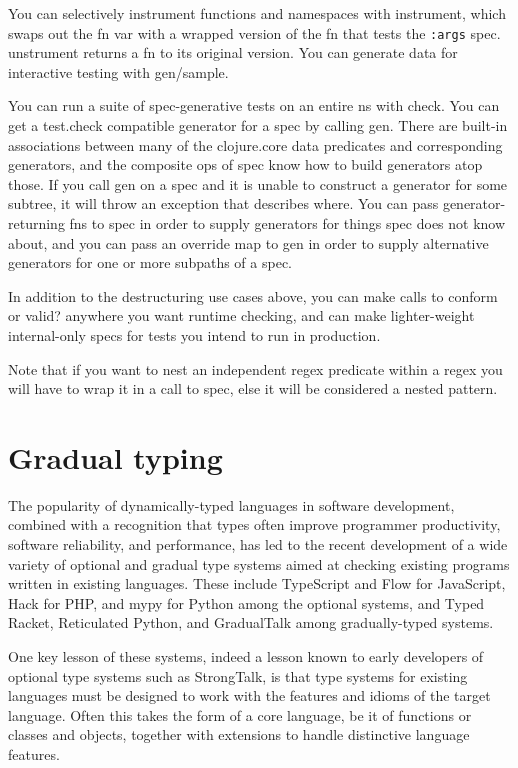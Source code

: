 You can selectively instrument functions and namespaces with instrument, which
swaps out the fn var with a wrapped version of the fn that tests the
\texttt{:args} spec. unstrument returns a fn to its original version. You can
generate data for interactive testing with gen/sample.

You can run a suite of spec-generative tests on an entire ns with check. You can
get a test.check compatible generator for a spec by calling gen. There are
built-in associations between many of the clojure.core data predicates and
corresponding generators, and the composite ops of spec know how to build
generators atop those. If you call gen on a spec and it is unable to construct a
generator for some subtree, it will throw an exception that describes where. You
can pass generator-returning fns to spec in order to supply generators for
things spec does not know about, and you can pass an override map to gen in
order to supply alternative generators for one or more subpaths of a spec.

In addition to the destructuring use cases above, you can make calls to conform
or valid? anywhere you want runtime checking, and can make lighter-weight
internal-only specs for tests you intend to run in production.

Note that if you want to nest an independent regex predicate within a regex you
will have to wrap it in a call to spec, else it will be considered a nested
pattern.


\section{Gradual typing}
The popularity of dynamically-typed languages in software development, combined
with a recognition that types often improve programmer productivity, software
reliability, and performance, has led to the recent development of a wide
variety of optional and gradual type systems aimed at checking existing programs
written in existing languages. These include TypeScript and Flow for JavaScript,
Hack for PHP, and mypy for Python among the optional systems, and Typed Racket,
Reticulated Python, and GradualTalk among gradually-typed systems.

One key lesson of these systems, indeed a lesson known to early developers of
optional type systems such as StrongTalk, is that type systems for existing
languages must be designed to work with the features and idioms of the target
language. Often this takes the form of a core language, be it of functions or
classes and objects, together with extensions to handle distinctive language
features.

